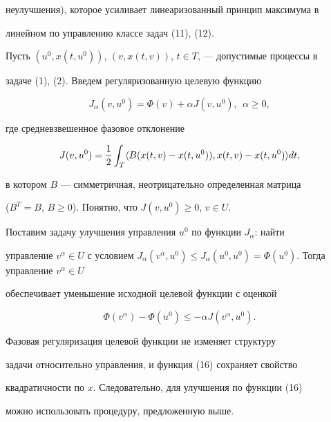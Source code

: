 неулучшения), которое усиливает линеаризованный принцип максимума в 


линейном по управлению классе задач (11), (12). 


 


Пусть $(u^0,x(t,u^0))$, $(v,x(t,v))$, $t\in T$, --- допустимые процессы в 


задаче (1), (2). Введем регуляризованную целевую функцию 


\begin{equation} 


J_\alpha(v,u^0)=\Phi(v)+\alpha J(v,u^0),\ \ \alpha\ge0, 


\end{equation} 


где средневзвешенное фазовое отклонение 


$$ 


J(v,u^0)=\frac{1}{2}\int_T\la B(x(t,v)-x(t,u^0)),x(t,v)- 


x(t,u^0)\ra d t, 


$$ 


в котором $B$ --- симметричная, неотрицательно определенная матрица 


($B^T=B$, $B\ge0$). Понятно, что $J(v,u^0)\ge0$, $v\in U$. 


 


Поставим задачу улучшения управления $u^0$ по функции $J_\alpha$: найти 


управление $v^\alpha\in U$ с условием $J_\alpha(v^\alpha,u^0)\le 


J_\alpha(u^0,u^0)=\Phi(u^0)$. Тогда управление $v^\alpha\in U$ 


обеспечивает уменьшение исходной целевой функции с оценкой 


\begin{equation} 


\Phi(v^\alpha)-\Phi(u^0)\le-\alpha J(v^\alpha,u^0). 


\end{equation} 


 


Фазовая регуляризация целевой функции не изменяет структуру 


задачи относительно управления, и функция (16) сохраняет свойство 


квадратичности по $x$. Следовательно, для улучшения по функции (16) 


можно использовать процедуру, предложенную выше. 



